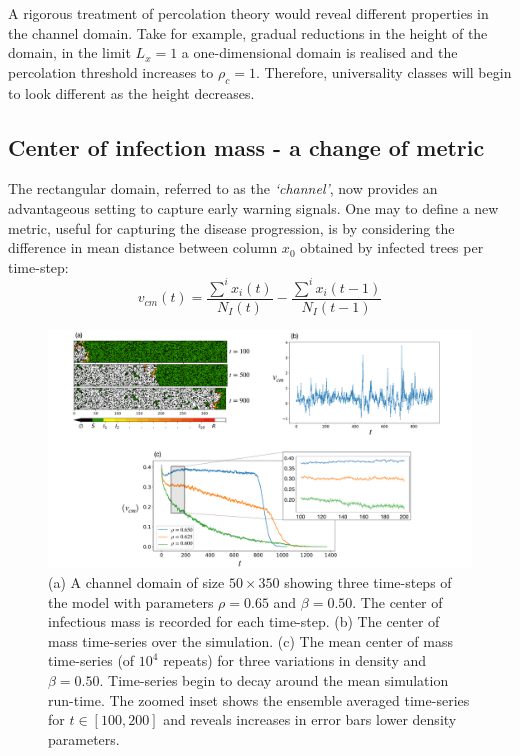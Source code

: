 A rigorous treatment of percolation theory would reveal different properties in the channel domain. %
Take for example, gradual reductions in the height of the domain, in the limit $L_x = 1$ a one-dimensional domain is realised and the percolation threshold increases to $\rho_c=1$. %
Therefore, universality classes will begin to look different as the height decreases. %


\subsection{Center of infection mass - a change of metric}

The rectangular domain, referred to as the \textit{`channel'}, now provides an advantageous setting to capture early warning signals. %
One may to define a new metric, useful for capturing the disease progression, is by considering the difference in mean distance between column $x_0$ obtained by infected trees per time-step:
\begin{equation}
   v_{cm}(t) = \frac{\sum^i x_i(t)}{N_I(t)} - \frac{\sum^i x_i(t-1)}{N_I(t-1)}
   \label{eq:COM}
\end{equation}

\begin{figure}
    \centering
    \includegraphics[scale=0.30]{chapter3/figures/figure10.pdf}
    \caption{(a) A channel domain of size $50\times350$ showing three time-steps of the model with parameters $\rho=0.65$ and $\beta=0.50$. The center of infectious mass is recorded for each time-step. (b) The center of mass time-series over the simulation. (c) The mean center of mass time-series (of $10^4$ repeats) for three variations in density and $\beta=0.50$. Time-series begin to decay around the mean simulation run-time.  The zoomed inset shows the ensemble averaged time-series for $t\in[100, 200]$ and reveals increases in error bars lower density parameters.}
    \label{fig:ews-primer}
\end{figure}

